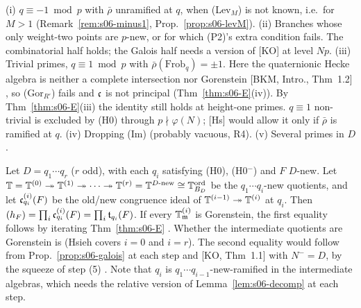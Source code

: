 \begin{remark}\label{rem:s06-open}
(i) $q\equiv-1\bmod p$ with $\bar\rho$ unramified at $q$, when (Lev$_M$) is not known, i.e.\ for $M>1$ (Remark~\ref{rem:s06-minus1},
Prop.~\ref{prop:s06-levM}).  (ii) Branches whose only weight-two points
are $p$-new, or for which (P2)'s extra condition fails. The combinatorial half holds; the Galois half needs a version of [KO] at level
$Np$. (iii) Trivial primes, $q\equiv1\bmod p$ with $\bar\rho(\mathrm{Frob}_q)=\pm1$. Here the quaternionic Hecke algebra is
neither a complete intersection nor Gorenstein [BKM, Intro., Thm~1.2]
\stcited, so (Gor$_{R'}$) fails and $\mathfrak{c}$ is not principal (Thm~\ref{thm:s06-E}(iv)). By Thm~\ref{thm:s06-E}(iii) the identity
still holds at height-one primes. $q\equiv1$ non-trivial is excluded by (H0) through $p\nmid\varphi(N)$; [Hs] would allow it only
if $\bar\rho$ is ramified at $q$. (iv) Dropping (Im) (probably vacuous, R4). (v) Several primes in $D$.
\end{remark}

\begin{conjecture}\label{conj:s06-several}
Let $D=q_1\cdots q_r$ ($r$ odd), with each $q_i$ satisfying (H0), (H0$^-$) and $F$ $D$-new. Let
$\mathbb{T}=\mathbb{T}^{(0)}\twoheadrightarrow\mathbb{T}^{(1)}\twoheadrightarrow\cdots\twoheadrightarrow\mathbb{T}^{(r)}=\mathbb{T}^{D\text{-new}}\cong\mathbb{T}^{\mathrm{ord}}_{B_D}$ be the
$q_1\cdots q_i$-new quotients, and let $\mathfrak{c}^{(i)}_{q_i}(F)$ be the old/new congruence ideal of $\mathbb{T}^{(i-1)}\twoheadrightarrow\mathbb{T}^{(i)}$ at
$q_i$. Then $(h_F)=\prod_i\mathfrak{c}^{(i)}_{q_i}(F)=\prod_i\mathfrak{t}_{q_i}(F)$. \stconj{} If every $\mathbb{T}^{(i)}_{\mathfrak{m}}$ is Gorenstein, the first
equality follows by iterating Thm~\ref{thm:s06-E} \stsketch. Whether the intermediate quotients are Gorenstein is \stopen{} (Hsieh
covers $i=0$ and $i=r$). The second equality would follow from Prop.~\ref{prop:s06-galois} at each step and [KO, Thm~1.1] with
$N^-=D$, by the squeeze of step (5) \stsketch. Note that $q_i$ is $q_1\cdots q_{i-1}$-new-ramified in the intermediate algebras,
which needs the relative version of Lemma~\ref{lem:s06-decomp} at each step.
\end{conjecture}

